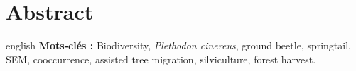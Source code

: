 \chapter*{Abstract}             %
\label{chap-abstract}           %

\begin{otherlanguage*}{english}
  \textbf{Mots-clés :} Biodiversity, \textit{Plethodon cinereus}, ground beetle, springtail, SEM, cooccurrence, assisted tree migration, silviculture, forest harvest.
\end{otherlanguage*}
